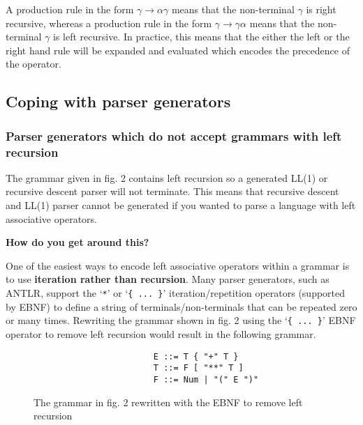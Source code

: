 \documentclass[12pt, letterpaper]{article}
\theoremstyle{definition}
\begin{document}
A production rule in the form $\gamma \rightarrow \alpha \gamma$ means that the non-terminal $\gamma$ is right recursive, whereas a production rule in the form $\gamma \rightarrow \gamma \alpha$ means that the non-terminal $\gamma$ is left recursive. In practice, this means that the either the left or the right hand rule will be expanded and evaluated which encodes the precedence of the operator.\textsuperscript{\cite{abrahamson_2021}\cite{lam_2019}}

\subsection{Coping with parser generators}

\subsubsection{Parser generators which do not accept grammars with left recursion}

The grammar given in fig. 2 contains left recursion so a generated LL(1) or recursive descent parser will not terminate. This means that recursive descent and LL(1) parser cannot be generated if you wanted to parse a language with left associative operators.

\begin{center}
    \textbf{How do you get around this?}
\end{center}

One of the easiest ways to encode left associative operators within a grammar is to use \textbf{iteration rather than recursion}. Many parser generators, such as ANTLR, support the `\verb|*|' or `\verb|{ ... }|' iteration/repetition operators (supported by EBNF) to define a string of terminals/non-terminals that can be repeated zero or many times. Rewriting the grammar shown in fig. 2 using the `\verb|{ ... }|' EBNF operator to remove left recursion would result in the following grammar.\textsuperscript{\cite{pattis_2021}}

\begin{figure}[H]
    \begin{center}
        \begin{verbatim}
                        E ::= T { "+" T }
                        T ::= F [ "**" T ]
                        F ::= Num | "(" E ")"
        \end{verbatim}
    \end{center}
    \vspace{-1.5em}
    \caption{The grammar in fig. 2 rewritten with the EBNF to remove left recursion}
\end{figure}
\end{document}
